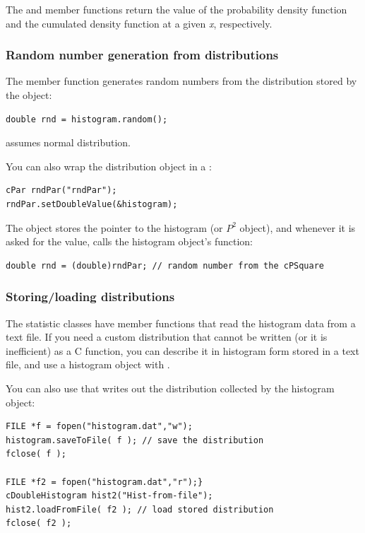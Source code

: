 The  and  member functions
return the value of the probability density function and the cumulated
density function at a given \textit{x}, respectively.


\subsubsection{Random number generation from distributions}


The  member function generates random
numbers from the distribution stored by the
object:

\begin{verbatim}
double rnd = histogram.random();
\end{verbatim}


 assumes normal distribution.

You can also wrap the distribution object in a :

\begin{verbatim}
cPar rndPar("rndPar");
rndPar.setDoubleValue(&histogram);
\end{verbatim}


The  object stores the pointer to the histogram (or $P^{2}$ object),
and whenever it is asked for the value, calls the histogram object's 
function:

\begin{verbatim}
double rnd = (double)rndPar; // random number from the cPSquare
\end{verbatim}

\subsubsection{Storing/loading distributions}


The statistic classes have  member functions
that read the histogram data from a text file. If you need a custom
distribution that cannot be written (or it
is inefficient) as a C function, you can describe it in histogram form
stored in a text file, and use a histogram object with
.

You can also use that writes out the distribution
collected by the histogram object:

\begin{verbatim}
FILE *f = fopen("histogram.dat","w");
histogram.saveToFile( f ); // save the distribution
fclose( f );

FILE *f2 = fopen("histogram.dat","r");}
cDoubleHistogram hist2("Hist-from-file");
hist2.loadFromFile( f2 ); // load stored distribution
fclose( f2 );
\end{verbatim}


